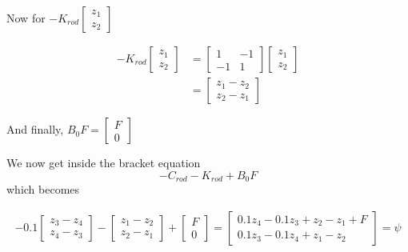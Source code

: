 \documentclass[12pt,a4paper, onecolumn]{exam}
\begin{document}
\begin{questions}
\begin{parts}
\begin{solution}
    Now for $ -K_{rod} \begin{bmatrix}
        z_1\\
        z_2
    \end{bmatrix}  $ 

    \begin{align*}
      -K_{rod} \begin{bmatrix}
        z_1\\
        z_2
    \end{bmatrix}  &= \begin{bmatrix}
        1&-1\\
        -1&1 
    \end{bmatrix} \begin{bmatrix}
        z_1\\
        z_2
    \end{bmatrix} \\
    &= \begin{bmatrix}
        z_1 - z_2\\
        z_2 - z_1
    \end{bmatrix}   
    \end{align*}
    
    And finally, $ B_0 F = \begin{bmatrix}
        F\\
        0    
      \end{bmatrix}  $ 
     
    We now get inside the bracket equation
    \[
        -C_{rod} - K_{rod} + B_0F
    \]
    which becomes

    \begin{align*}
      -0.1 \begin{bmatrix}
          z_3 - z_4\\
          z_4 - z_3
      \end{bmatrix} - \begin{bmatrix}
          z_1 - z_2\\
          z_2 - z_1
      \end{bmatrix} + \begin{bmatrix}
          F\\
          0
      \end{bmatrix}  = \begin{bmatrix}
          0.1z_4 - 0.1z_3 + z_2 - z_1 + F\\
          0.1z_3 - 0.1z_4 + z_1 - z_2 
      \end{bmatrix} = \psi
    \end{align*}
    

\end{solution}
\end{parts}
\end{questions}
\end{document}
